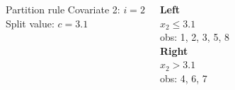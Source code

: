 \begin{frame}{}
{\begin{columns}[T]
  \vspace{1em}
  \begin{block}{Partition rule}
    Covariate 2: $i=2$ \\ Split value: $c =3.1$\\
    
  \end{block}
  \vspace{0.8em}
  \textcolor{blue!80!black}{\textbf{Left}} \\
  \hspace{0.5em} $x_2 \leq 3.1$ \\[0.2em]
  \hspace{0.5em} obs: 1, 2, 3, 5, 8 \\[0.6em]
  \textcolor{red!80!black}{\textbf{Right}} \\
   \hspace{0.5em} $x_2 > 3.1$ \\
  \hspace{0.5em} obs: 4, 6, 7


\end{columns}
}


\end{frame}






